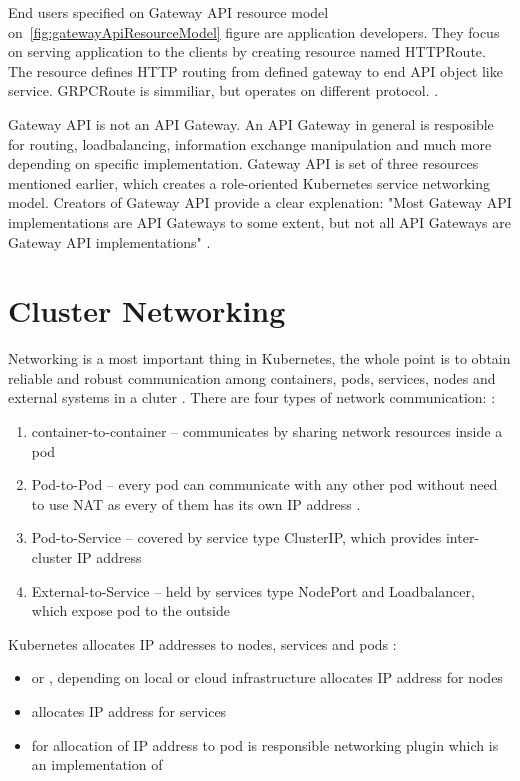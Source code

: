 End users specified on Gateway API resource model on~\ref{fig:gatewayApiResourceModel} figure are application developers. They focus on serving application to the clients by creating resource named HTTPRoute. The resource defines HTTP routing from defined gateway to end API object like service. GRPCRoute is simmiliar, but operates on different protocol. \cite{KubernetesGatewayAPI} \cite{KubernetesHTTPRoute}.


Gateway API is not an API Gateway. An API Gateway in general is resposible for routing, loadbalancing, information exchange manipulation and much more depending on specific implementation. Gateway API is set of three resources mentioned earlier, which creates a role-oriented Kubernetes service networking model. Creators of Gateway API provide a clear explenation: "Most Gateway API implementations are API Gateways to some extent, but not all API Gateways are Gateway API implementations" \cite{KubernetesGatewayAPI}.





\section{Cluster Networking}
\label{sec:k8s_networking}

Networking is a most important thing in Kubernetes, the whole point is to obtain reliable and robust communication among containers, pods, services, nodes and external systems in a cluter \cite{KubernetesClusterNetworking}. There are four types of network communication: \cite{KubernetesClusterNetworking}:

\begin{enumerate}
    \item container-to-container -- communicates by sharing network resources inside a pod
    \item Pod-to-Pod -- every pod can communicate with any other pod without need to use NAT as every of them has its own IP address \cite{IBMKubernetesNetworking}.
    \item Pod-to-Service -- covered by service type ClusterIP, which provides inter-cluster IP address
    \item External-to-Service -- held by services type NodePort and Loadbalancer, which expose pod to the outside
\end{enumerate}
Kubernetes allocates IP addresses to nodes, services and pods \cite{KubernetesClusterNetworking}:
\begin{itemize}
    \item \textit{} or \textit{}, depending on local or cloud infrastructure allocates IP address for nodes
    \item \textit{} allocates IP address for services
    \item for allocation of IP address to pod is responsible networking plugin which is an implementation of \textit{}
\end{itemize}


